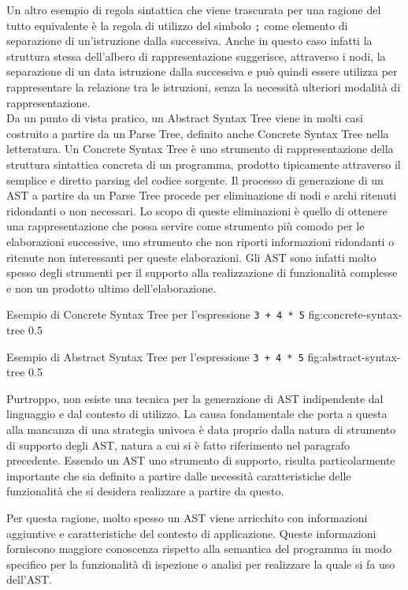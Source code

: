 Un altro esempio di regola sintattica che viene trascurata per una ragione del
tutto equivalente è la regola di utilizzo del simbolo \texttt{;} come elemento
di separazione di un’istruzione dalla successiva. Anche in questo caso infatti
la struttura stessa dell’albero di rappresentazione suggerisce, attraverso i
nodi, la separazione di un data istruzione dalla successiva e può quindi essere
utilizza per rappresentare la relazione tra le istruzioni, senza la necessità
ulteriori modalità di rappresentazione.\\

Da un punto di vista pratico, un Abstract Syntax Tree viene in molti casi
costruito a partire da un Parse Tree, definito anche Concrete Syntax Tree nella
letteratura. Un Concrete Syntax Tree è uno strumento di rappresentazione della
struttura sintattica concreta di un programma, prodotto tipicamente attraverso
il semplice e diretto parsing del codice sorgente. Il processo di generazione
di un AST a partire da un Parse Tree procede per eliminazione di nodi e archi
ritenuti ridondanti o non necessari. Lo scopo di queste eliminazioni è quello di
ottenere una rappresentazione che possa servire come strumento più comodo per le
elaborazioni successive, uno strumento che non riporti informazioni ridondanti o
ritenute non interessanti per queste elaborazioni. Gli AST sono infatti molto
spesso degli strumenti per il supporto alla realizzazione di funzionalità
complesse e non un prodotto ultimo dell’elaborazione.

      {Esempio di Concrete Syntax Tree per l'espressione \texttt{3 + 4 * 5}}
      {fig:concrete-syntax-tree}
      {0.5}

      {Esempio di Abstract Syntax Tree per l'espressione \texttt{3 + 4 * 5}}
      {fig:abstract-syntax-tree}
      {0.5}

Purtroppo, non esiste una tecnica per la generazione di AST indipendente dal
linguaggio e dal contesto di utilizzo. La causa fondamentale che porta a questa
alla mancanza di una strategia univoca è data proprio dalla natura di strumento
di supporto degli AST, natura a cui si è fatto riferimento nel paragrafo
precedente. Essendo un AST uno strumento di supporto, risulta particolarmente
importante che sia definito a partire dalle necessità caratteristiche
delle funzionalità che si desidera realizzare a partire da questo.

Per questa ragione, molto spesso un AST viene arricchito con informazioni
aggiuntive e caratteristiche del contesto di applicazione. Queste informazioni
forniscono maggiore conoscenza rispetto alla semantica del programma in modo
specifico per la funzionalità di ispezione o analisi per realizzare la quale si
fa uso dell’AST.

